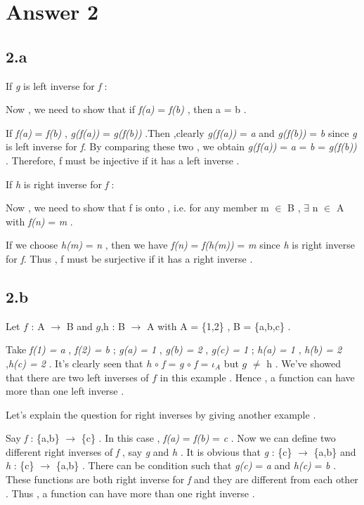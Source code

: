 \documentclass[12pt]{article}
\begin{document}
\section*{Answer 2}

\subsection*{2.a}
\hspace{15px} If \textit{g} is left inverse for \textit{f} : \par 
Now , we need to show that if \textit{f(a)} = \textit{f(b)} , then a = b . \par 
If \textit{f(a)} = \textit{f(b)} , \textit{g(f(a))} = \textit{g(f(b))} .Then ,clearly \textit{g(f(a))} = \textit{a} and \textit{g(f(b))} = \textit{b} since \textit{g} is left inverse for \textit{f}. By comparing these two , we obtain \textit{g(f(a))} = \textit{a}  = \textit{b} = \textit{g(f(b))} . Therefore, f must be injective if it has a left inverse . \par \bigskip
If \textit{h} is right inverse for \textit{f} : \par
Now , we need to show that f is onto , i.e. for any member m $\in$ B , $\exists$ n $\in$ A with \textit{f(n)} = \textit{m} . \par 
If we choose \textit{h(m)} = \textit{n} , then we have \textit{f(n)} = \textit{f(h(m))} = \textit{m} since \textit{h} is right inverse for \textit{f}. Thus , f must be surjective if it has a right inverse .
\subsection*{2.b}
\hspace{15px} Let $\textit{f}$ : A $\rightarrow$ B and $\textit{g,h}$ : B $\rightarrow$ A with A = \{1,2\} , B = \{a,b,c\} . \par 
Take \textit{f(1) = a} , \textit{f(2) = b} ; \textit{g(a) = 1} , \textit{g(b) = 2} , \textit{g(c) = 1} ; \textit{h(a) = 1} , \textit{h(b) = 2} ,\textit{h(c) = 2} . It's clearly seen that \textit{h} $\circ$ \textit{f} = \textit{g} $\circ$ \textit{f} = $\iota_A$ but $\textit{g}$ $\neq$ $\textit{h}$ . We've showed that there are two left inverses of $\textit{f}$ in this example . Hence , a function can have more than one left inverse . \par \bigskip
Let's explain the question for right inverses by giving another example . \par 
Say \textit{f} : \{a,b\} $\rightarrow$ \{c\} . In this case , \textit{f(a)} = \textit{f(b)} = \textit{c} . Now we can define two different right inverses of \textit{f} , say \textit{g} and \textit{h} . It is obvious that \textit{g} : \{c\} $\rightarrow$ \{a,b\} and \textit{h} : \{c\} $\rightarrow$ \{a,b\} . There can be condition such that \textit{g(c)} = \textit{a} and \textit{h(c)} = \textit{b} . These functions are both right inverse for \textit{f} and they are different from each other . Thus , a function can have more than one right inverse . 
\end{document}
